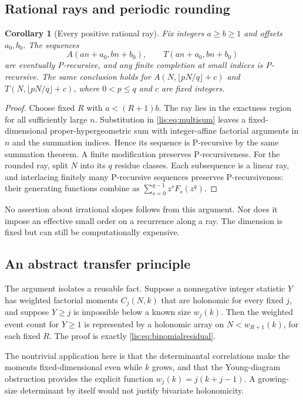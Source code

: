 \documentclass[11pt,letterpaper]{article}
\numberwithin{equation}{section}
\newtheorem{corollary}[theorem]{Corollary}
\theoremstyle{definition}
\begin{document}
\subsection{Rational rays and periodic rounding}
\begin{corollary}[Every positive rational ray]\label{lis:cor:rays}
Fix integers $a\ge b\ge1$ and offsets $a_0,b_0$.
The sequences
\[
 A(an+a_0,bn+b_0),\qquad T(an+a_0,bn+b_0)
\]
are eventually P-recursive, and any finite completion at small indices
is P-recursive. The same conclusion holds for
$A(N,\lfloor pN/q\rfloor+c)$ and $T(N,\lfloor pN/q\rfloor+c)$,
where $0<p\le q$ and $c$ are fixed integers.
\end{corollary}
\begin{proof}
Choose fixed $R$ with $a<(R+1)b$. The ray lies in the exactness region
for all sufficiently large $n$. Substitution in \eqref{lis:eq:multisum}
leaves a fixed-dimensional proper-hypergeometric sum with integer-affine
factorial arguments in $n$ and the summation indices. Hence its sequence
is P-recursive by the same summation theorem. A finite modification
preserves P-recursiveness. For the rounded ray, split $N$ into its $q$
residue classes. Each subsequence is a linear ray, and interlacing finitely
many P-recursive sequences preserves P-recursiveness: their generating
functions combine as $\sum_{s=0}^{q-1}z^sF_s(z^q)$.
\end{proof}

No assertion about irrational slopes follows from this argument.
Nor does it impose an effective small order on a recurrence along a ray.
The dimension is fixed but can still be computationally expensive.

\subsection{An abstract transfer principle}
The argument isolates a reusable fact. Suppose a nonnegative integer
statistic $Y$ has weighted factorial moments $C_j(N,k)$ that are
holonomic for every fixed $j$, and suppose $Y\ge j$ is impossible
below a known size $w_j(k)$. Then the weighted event count for $Y\ge1$
is represented by a holonomic array on $N<w_{R+1}(k)$, for each fixed
$R$. The proof is exactly \eqref{lis:eq:binomialresidual}.

The nontrivial application here is that the determinantal correlations
make the moments fixed-dimensional even while $k$ grows, and that the
Young-diagram obstruction provides the explicit function
$w_j(k)=j(k+j-1)$. A growing-size determinant by itself would not
justify bivariate holonomicity.
\end{document}
